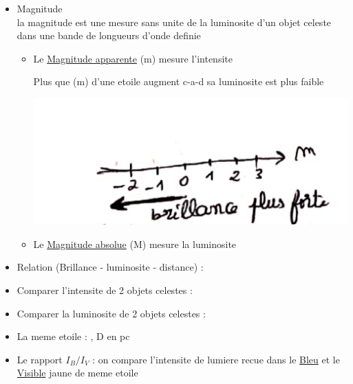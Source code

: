 \documentclass[12pt]{book}
\begin{document}
\begin{itemize}
\begin{itemize}
\begin{itemize}
                        \end{itemize}
                    \item Magnitude \\
                        la magnitude est une mesure sans unite de la luminosite d'un objet celeste dans une bande de longueurs d'onde definie\\
                        \begin{itemize}
                            \item Le  \underline{Magnitude apparente} (m) mesure l'intensite\\
                                \begin{minipage}{0.49\linewidth}
                                    Plus que (m) d'une etoile augment c-a-d sa luminosite est plus faible 
                                \end{minipage}
                                \begin{minipage}{0.5\linewidth}
                                    \includegraphics[width=\linewidth]{pic/magnitudeapparente.png}
                                \end{minipage}
                            \item Le  \underline{Magnitude absolue} (M) mesure la luminosite
                        \end{itemize}
                    \item Relation (Brillance - luminosite - distance) : 
                    \item Comparer l'intensite de 2 objets celestes : 
                    \item Comparer la luminosite de 2 objets celestes :  
                    \item La meme etoile :  , D en pc 
                    \item Le rapport $ I_B/I_V$ : on compare l'intensite de lumiere recue dans le \underline{Bleu} et le \underline{Visible} jaune de meme etoile \\

\end{itemize}
\end{itemize}
\end{document}
